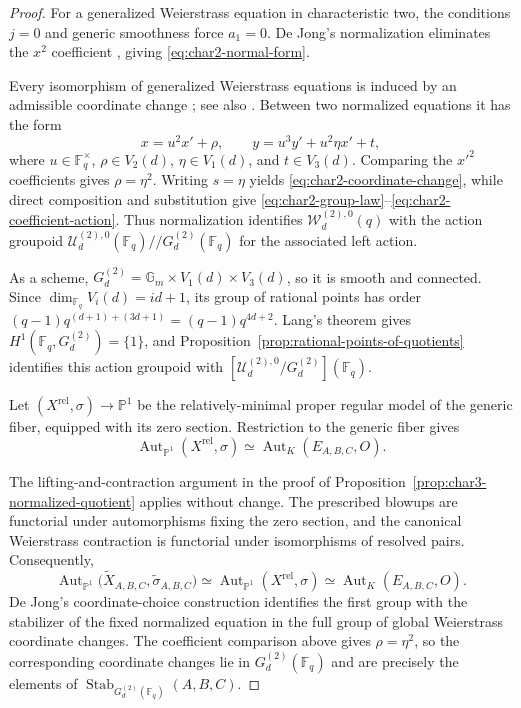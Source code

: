 \documentclass[a4paper,12pt]{amsart}
\theoremstyle{definition}
\newcommand{\cU}{\mathcal{U}}
\newcommand{\cW}{\mathcal{W}}
\newcommand{\Fb}{\mathbb{F}}
\newcommand{\Pb}{\mathbb{P}}
\newcommand{\Gb}{\mathbb{G}}
\newcommand{\Aut}{\operatorname{Aut}}
\begin{document}
\begin{proof}
For a generalized Weierstrass equation in characteristic two, the conditions $j=0$ and generic smoothness force $a_1=0$.  De Jong's normalization eliminates the $x^2$ coefficient \cite[Section~4.13(c2)]{dJ2}, giving \eqref{eq:char2-normal-form}.

Every isomorphism of generalized Weierstrass equations is induced by an admissible coordinate change \cite[Sections~4.8--4.9]{dJ2}; see also \cite[Chapter~III, Section~1]{Silverman}.  Between two normalized equations it has the form
\[
x=u^2x'+\rho,
\qquad
y=u^3y'+u^2\eta x'+t,
\]
where $u\in\Fb_q^\times$, $\rho\in V_2(d)$, $\eta\in V_1(d)$, and $t\in V_3(d)$.  Comparing the $x'^2$ coefficients gives $\rho=\eta^2$.  Writing $s=\eta$ yields \eqref{eq:char2-coordinate-change}, while direct composition and substitution give \eqref{eq:char2-group-law}--\eqref{eq:char2-coefficient-action}.  Thus normalization identifies $\cW_d^{(2),0}(q)$ with the action groupoid $\cU_d^{(2),0}(\Fb_q)\mathbin{//}G_d^{(2)}(\Fb_q)$ for the associated left action.

As a scheme, $G_d^{(2)}=\Gb_m\times V_1(d)\times V_3(d)$, so it is smooth and connected.  Since $\dim_{\Fb_q}V_i(d)=id+1$, its group of rational points has order $(q-1)q^{(d+1)+(3d+1)}=(q-1)q^{4d+2}$.  Lang's theorem gives $H^1(\Fb_q,G_d^{(2)})=\{1\}$, and Proposition~\ref{prop:rational-points-of-quotients} identifies this action groupoid with $[\cU_d^{(2),0}/G_d^{(2)}](\Fb_q)$.

Let $(X^{\mathrm{rel}},\sigma)\to\Pb^1$ be the relatively-minimal proper regular model of the generic fiber, equipped with its zero section.  Restriction to the generic fiber gives
\[
\Aut_{\Pb^1}(X^{\mathrm{rel}},\sigma)
\simeq
\Aut_K(E_{A,B,C},O).
\]

The lifting-and-contraction argument in the proof of Proposition~\ref{prop:char3-normalized-quotient} applies without change.  The prescribed blowups are functorial under automorphisms fixing the zero section, and the canonical Weierstrass contraction is functorial under isomorphisms of resolved pairs.  Consequently,
\[
\Aut_{\Pb^1}\bigl(\widetilde X_{A,B,C},\widetilde\sigma_{A,B,C}\bigr)
\simeq
\Aut_{\Pb^1}(X^{\mathrm{rel}},\sigma)
\simeq
\Aut_K(E_{A,B,C},O).
\]
De Jong's coordinate-choice construction identifies the first group with the stabilizer of the fixed normalized equation in the full group of global Weierstrass coordinate changes.  The coefficient comparison above gives $\rho=\eta^2$, so the corresponding coordinate changes lie in $G_d^{(2)}(\Fb_q)$ and are precisely the elements of $\operatorname{Stab}_{G_d^{(2)}(\Fb_q)}(A,B,C)$.
\end{proof}
\end{document}

